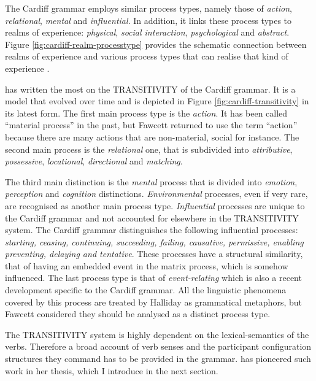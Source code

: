     The Cardiff grammar employs similar process types, namely those of \textit{action}, \textit{relational}, \textit{mental} and \textit{influential}. In addition, it links these process types to realms of experience: \textit{physical}, \textit{social interaction}, \textit{psychological} and \textit{abstract}. Figure \ref{fig:cardiff-realm-processtype} provides the schematic connection between realms of experience and various process types that can realise that kind of experience \citep[37]{Fawcett2009}. 

    \citet{Fawcett1973,Fawcett87-relational,Fawcett96} has written the most on the TRANSITIVITY of the Cardiff grammar. It is a model that evolved over time and is depicted in Figure \ref{fig:cardiff-transitivity} in its latest form. The first main process type is the \textit{action}. It has been called ``material process'' in the past, but Fawcett returned to use the term ``action'' because there are many actions that are non-material, social for instance. The second main process is the \textit{relational} one, that is subdivided into \textit{attributive}, \textit{possessive}, \textit{locational}, \textit{directional} and \textit{matching}.

    The third main distinction is the \textit{mental} process that is divided into \textit{emotion}, \textit{perception} and \textit{cognition} distinctions. \textit{Environmental} processes, even if very rare, are recognised as another main process type. \textit{Influential} processes are unique to the Cardiff grammar and not accounted for elsewhere in the TRANSITIVITY system. The Cardiff grammar distinguishes the following influential processes: \textit{starting, ceasing, continuing, succeeding, failing, causative, permissive, enabling preventing, delaying and tentative}. These processes have a structural similarity, that of having an embedded event in the matrix process, which is somehow influenced. The last process type is that of \textit{event-relating} which is also a recent development specific to the Cardiff grammar. All the linguistic phenomena covered by this process are treated by Halliday as grammatical metaphors, but Fawcett considered they should be analysed as a distinct process type.
    
    The TRANSITIVITY system is highly dependent on the lexical-semantics of the verbs. Therefore a broad account of verb senses and the participant configuration structures they command has to be provided in the grammar. \citet{Neale2002} has pioneered such work in her thesis, which I introduce in the next section. 

